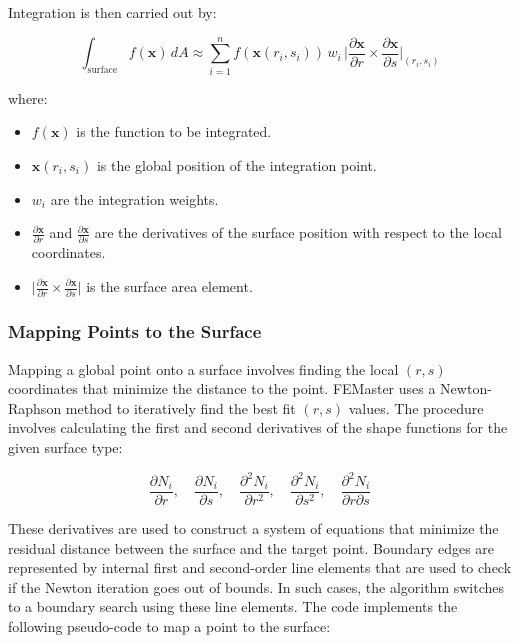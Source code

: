 Integration is then carried out by:

\[
    \int_{\text{surface}} f(\mathbf{x}) \, dA \approx \sum_{i=1}^{n} f(\mathbf{x}(r_i, s_i)) \, w_i \, \bigg| \frac{\partial \mathbf{x}}{\partial r} \times \frac{\partial \mathbf{x}}{\partial s} \bigg|_{(r_i, s_i)}
\]

where:
\begin{itemize}
    \item \( f(\mathbf{x}) \) is the function to be integrated.
    \item \( \mathbf{x}(r_i, s_i) \) is the global position of the integration point.
    \item \( w_i \) are the integration weights.
    \item \( \frac{\partial \mathbf{x}}{\partial r} \) and \( \frac{\partial \mathbf{x}}{\partial s} \) are the derivatives of the surface position with respect to the local coordinates.
    \item \( \bigg| \frac{\partial \mathbf{x}}{\partial r} \times \frac{\partial \mathbf{x}}{\partial s} \bigg| \) is the surface area element.
\end{itemize}

\subsubsection{Mapping Points to the Surface}
Mapping a global point onto a surface involves finding the local $(r, s)$ coordinates that minimize the distance to the point. FEMaster uses a Newton-Raphson method to iteratively find the best fit $(r, s)$ values. The procedure involves calculating the first and second derivatives of the shape functions for the given surface type:

\[
\frac{\partial N_i}{\partial r}, \quad \frac{\partial N_i}{\partial s}, \quad \frac{\partial^2 N_i}{\partial r^2}, \quad \frac{\partial^2 N_i}{\partial s^2}, \quad \frac{\partial^2 N_i}{\partial r \partial s}
\]

These derivatives are used to construct a system of equations that minimize the residual distance between the surface and the target point. Boundary edges are represented by internal first and second-order line elements that are used to check if the Newton iteration goes out of bounds. In such cases, the algorithm switches to a boundary search using these line elements.
The code implements the following pseudo-code to map a point to the surface:


